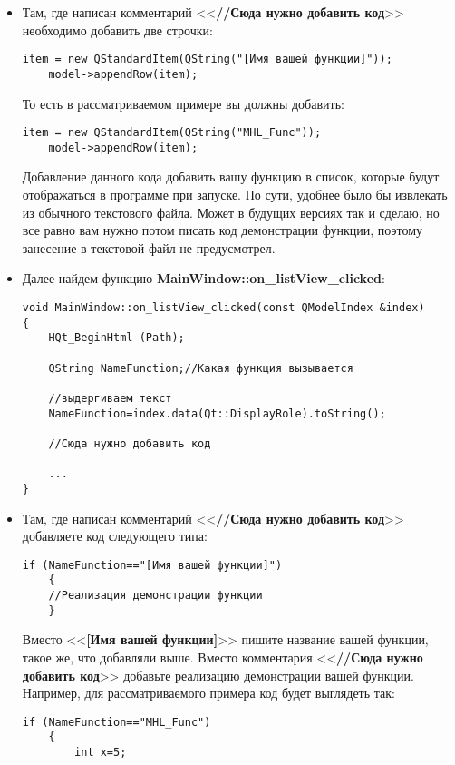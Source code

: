 \documentclass[a4paper,12pt]{article}
\begin{document}
\begin{itemize}
\item Там, где написан комментарий <<\textbf{//Сюда нужно добавить код}>> необходимо добавить две строчки:
\begin{lstlisting}[label=examplefunction04, caption=Что добавить в mainwindow.cpp]
    item = new QStandardItem(QString("[Имя вашей функции]"));
    model->appendRow(item);
\end{lstlisting}
То есть в рассматриваемом примере вы должны добавить:
\begin{lstlisting}[label=examplefunction05, caption=Что добавить в mainwindow.cpp в примере]
    item = new QStandardItem(QString("MHL_Func"));
    model->appendRow(item);
\end{lstlisting}
Добавление данного кода добавить вашу функцию в список, которые будут отображаться в программе при запуске. По сути, удобнее было бы извлекать из обычного текстового файла. Может в будущих версиях так и сделаю, но все равно вам нужно потом писать код демонстрации функции, поэтому занесение в текстовой файл не предусмотрел.
\item Далее найдем функцию \textbf{MainWindow::on\_listView\_clicked}:
\begin{lstlisting}[label=examplefunction06, caption=MainWindow::on\_listView\_clicked]
void MainWindow::on_listView_clicked(const QModelIndex &index)
{
    HQt_BeginHtml (Path);

    QString NameFunction;//Какая функция вызывается

    //выдергиваем текст
    NameFunction=index.data(Qt::DisplayRole).toString();

    //Сюда нужно добавить код
	
	...
}
\end{lstlisting}
\item Там, где написан комментарий <<\textbf{//Сюда нужно добавить код}>> добавляете код следующего типа:
\begin{lstlisting}[label=examplefunction07, caption=Добавление демонстрации работы функции]
    if (NameFunction=="[Имя вашей функции]")
    {
	//Реализация демонстрации функции
    }
\end{lstlisting}
Вместо <<\textbf{[Имя вашей функции]}>> пишите название вашей функции, такое же, что добавляли выше. Вместо комментария <<\textbf{//Сюда нужно добавить код}>> добавьте реализацию демонстрации вашей функции. Например, для рассматриваемого примера код будет выглядеть так:
\begin{lstlisting}[label=examplefunction08, caption=Добавление демонстрации работы функции на примере]
    if (NameFunction=="MHL_Func")
    {
        int x=5;


\end{lstlisting}
\end{itemize}
\end{document}
